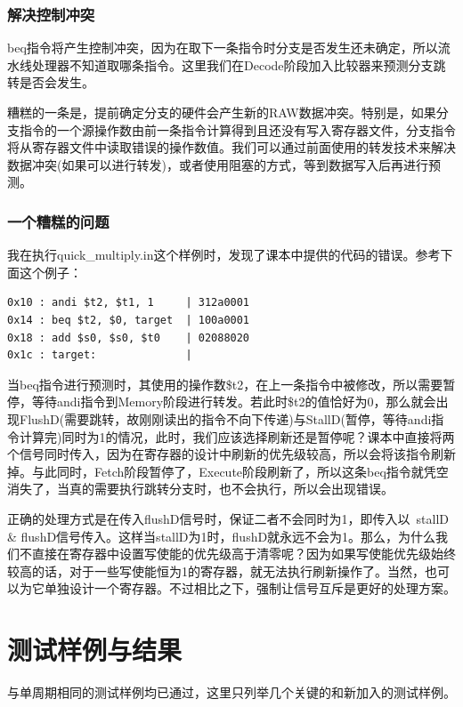 \documentclass[12pt]{article} %
\begin{document}
\begin{sloppypar}
\subsubsection{解决控制冲突}

beq指令将产生控制冲突，因为在取下一条指令时分支是否发生还未确定，所以流水线处理器不知道取哪条指令。这里我们在Decode阶段加入比较器来预测分支跳转是否会发生。

糟糕的一条是，提前确定分支的硬件会产生新的RAW数据冲突。特别是，如果分支指令的一个源操作数由前一条指令计算得到且还没有写入寄存器文件，分支指令将从寄存器文件中读取错误的操作数值。我们可以通过前面使用的转发技术来解决数据冲突(如果可以进行转发)，或者使用阻塞的方式，等到数据写入后再进行预测。

\subsubsection{一个糟糕的问题}

我在执行quick\_multiply.in这个样例时，发现了课本中提供的代码的错误。参考下面这个例子：
\begin{lstlisting}
0x10 : andi $t2, $t1, 1     | 312a0001
0x14 : beq $t2, $0, target  | 100a0001
0x18 : add $s0, $s0, $t0    | 02088020
0x1c : target:              | 
\end{lstlisting}
当beq指令进行预测时，其使用的操作数\$t2，在上一条指令中被修改，所以需要暂停，等待andi指令到Memory阶段进行转发。若此时\$t2的值恰好为0，那么就会出现FlushD(需要跳转，故刚刚读出的指令不向下传递)与StallD(暂停，等待andi指令计算完)同时为1的情况，此时，我们应该选择刷新还是暂停呢？课本中直接将两个信号同时传入，因为在寄存器的设计中刷新的优先级较高，所以会将该指令刷新掉。与此同时，Fetch阶段暂停了，Execute阶段刷新了，所以这条beq指令就凭空消失了，当真的需要执行跳转分支时，也不会执行，所以会出现错误。

正确的处理方式是在传入flushD信号时，保证二者不会同时为1，即传入以~stallD \& flushD信号传入。这样当stallD为1时，flushD就永远不会为1。那么，为什么我们不直接在寄存器中设置写使能的优先级高于清零呢？因为如果写使能优先级始终较高的话，对于一些写使能恒为1的寄存器，就无法执行刷新操作了。当然，也可以为它单独设计一个寄存器。不过相比之下，强制让信号互斥是更好的处理方案。


\newpage
\section{测试样例与结果}

与单周期相同的测试样例均已通过，这里只列举几个关键的和新加入的测试样例。


\end{sloppypar}
\end{document}

